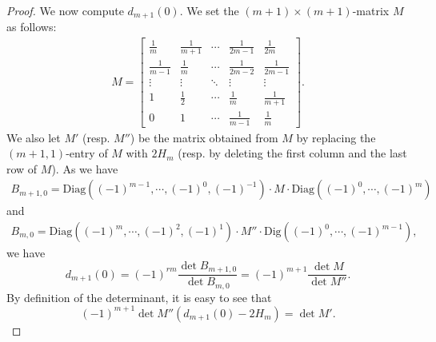 \documentclass[11pt]{amsart}
\theoremstyle{definition}
\numberwithin{equation}{subsection}
\theoremstyle{plain}
\theoremstyle{plain}
\theoremstyle{plain}
\theoremstyle{plain}
\theoremstyle{plain}
\theoremstyle{plain}
\theoremstyle{plain}
\theoremstyle{plain}
\theoremstyle{plain}
\theoremstyle{plain}
\theoremstyle{plain}
\theoremstyle{plain}
\theoremstyle{definition}
\theoremstyle{definition}
\theoremstyle{definition}
\theoremstyle{remark}
\renewcommand{\(}{\textup{(}}
\renewcommand{\)}{\textup{)}}
\begin{document}
\begin{proof}
We now compute $d_{m+1}(0)$. We set the $(m+1)\times(m+1)$-matrix $M$ as follows:
\begin{align*}
        M
        =
        \begin{bmatrix}
          \frac{1}{m} & \frac{1}{m+1} & \cdots & \frac{1}{2m-1} & \frac{1}{2m} \\
          \frac{1}{m-1} & \frac{1}{m} & \cdots & \frac{1}{2m-2} & \frac{1}{2m-1} \\
          \vdots & \vdots & \ddots & \vdots & \vdots \\
          1 & \frac{1}{2} & \cdots & \frac{1}{m} & \frac{1}{m+1} \\
          0 & 1 & \cdots & \frac{1}{m-1} & \frac{1}{m}
        \end{bmatrix}.
\end{align*}
We also let $M'$ (resp. $M''$) be the matrix obtained from $M$ by replacing the $(m+1,1)$-entry of $M$ with $2H_m$ (resp. by deleting the first column and the last row of $M$). As we have
\begin{align*}
        B_{m+1,0}
        =\mathrm{Diag}((-1)^{m-1},\cdots,(-1)^{0}, (-1)^{-1})
        \cdot
        M
        \cdot
        \mathrm{Diag}((-1)^0,\cdots,(-1)^{m})
\end{align*}
and
\begin{align*}
B_{m,0}=\mathrm{Diag}((-1)^{m},\cdots,(-1)^{2}, (-1)^{1})
        \cdot
        M''
        \cdot
        \mathrm{Dig}((-1)^0,\cdots,(-1)^{m-1}),
\end{align*}
we have $$d_{m+1}(0)=(-1)^{rm}\frac{\det B_{m+1,0}}{\det B_{m,0}}=(-1)^{m+1}\frac{\det M}{\det M''}.$$
By definition of the determinant, it is easy to see that $$(-1)^{m+1}\det M''\left(d_{m+1}(0)-2H_m\right)=\det M'.$$


\end{proof}
\end{document}

